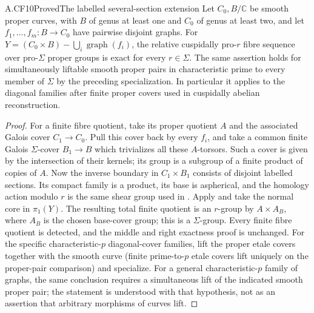 \begin{claim}{A.CF10}{Proved}{The labelled several-section extension}
Let $C_0,B/\mathbb C$ be smooth proper curves, with $B$ of genus at
least one and $C_0$ of genus at least two, and let
$f_1,\ldots,f_m:B\to C_0$ have pairwise disjoint graphs. For
$Y=(C_0\times B)-\bigcup_i\operatorname{graph}(f_i)$, the relative
cuspidally pro-$r$ fibre sequence over pro-$\Sigma$ proper groups
is exact for every $r\in\Sigma$. The same assertion holds for simultaneously liftable
smooth proper pairs in characteristic prime to every member of
$\Sigma$ by the preceding specialization. In particular it applies
to the diagonal families after finite proper covers used in
cuspidally abelian reconstruction.
\end{claim}
\begin{proof}
For a finite fibre quotient, take its proper quotient $A$ and the
associated Galois cover $C_1\to C_0$. Pull this cover back by every
$f_i$, and take a common finite Galois $\Sigma$-cover $B_1\to B$
which trivializes all these $A$-torsors. Such a cover is given by
the intersection of their kernels; its group is a subgroup of a
finite product of copies of $A$. Now the inverse boundary in
$C_1\times B_1$ consists of disjoint labelled sections. Its compact
family is a product, its base is aspherical, and the homology action
modulo $r$ is the same shear group used in
. Apply  and take the
normal core in $\pi_1(Y)$. The resulting total finite quotient is
an $r$-group by $A\times A_B$, where $A_B$ is the chosen base-cover
group; this is a $\Sigma$-group. Every finite fibre quotient is
detected, and the middle and right exactness proof is unchanged.
For the specific characteristic-$p$ diagonal-cover families, lift
the proper etale covers together with the smooth curve (finite
prime-to-$p$ etale covers lift uniquely on the proper-pair comparison)
and specialize. For a general characteristic-$p$ family of graphs,
the same conclusion requires a simultaneous lift of the indicated
smooth proper pair; the statement is understood with that hypothesis,
not as an assertion that arbitrary morphisms of curves lift.
\end{proof}

